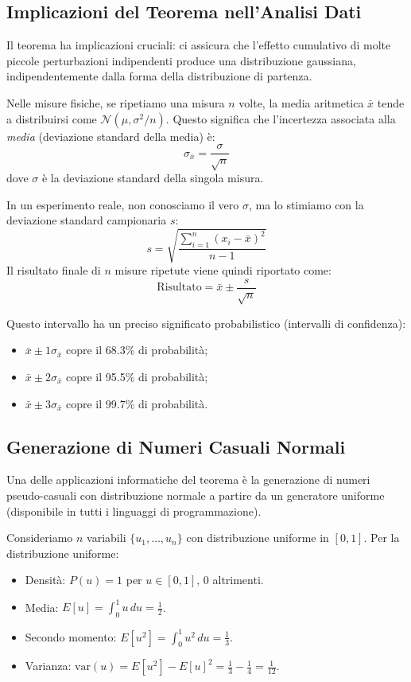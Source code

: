 \documentclass[openany,a4paper,12pt]{book}
\theoremstyle{remark}
\begin{document}
\subsection*{Implicazioni del Teorema nell'Analisi Dati}

Il teorema ha implicazioni cruciali: ci assicura che l'effetto cumulativo di molte piccole perturbazioni indipendenti produce una distribuzione gaussiana, indipendentemente dalla forma della distribuzione di partenza.

Nelle misure fisiche, se ripetiamo una misura $n$ volte, la media aritmetica $\bar{x}$ tende a distribuirsi come $\mathcal{N}(\mu, \sigma^2/n)$. Questo significa che l'incertezza associata alla \textit{media} (deviazione standard della media) è:
\begin{equation}
\sigma_{\bar{x}} = \frac{\sigma}{\sqrt{n}}
\end{equation}
dove $\sigma$ è la deviazione standard della singola misura.

In un esperimento reale, non conosciamo il vero $\sigma$, ma lo stimiamo con la deviazione standard campionaria $s$:
\[
s = \sqrt{\frac{\sum_{i=1}^{n} (x_i-\bar{x})^2}{n-1}}
\]
Il risultato finale di $n$ misure ripetute viene quindi riportato come:
\begin{equation}
\text{Risultato} = \bar{x} \pm \frac{s}{\sqrt{n}}
\end{equation}

Questo intervallo ha un preciso significato probabilistico (intervalli di confidenza):
\begin{itemize}
    \item $\bar{x} \pm 1\sigma_{\bar{x}}$ copre il 68.3\% di probabilità;
    \item $\bar{x} \pm 2\sigma_{\bar{x}}$ copre il 95.5\% di probabilità;
    \item $\bar{x} \pm 3\sigma_{\bar{x}}$ copre il 99.7\% di probabilità.
\end{itemize}

\subsection{Generazione di Numeri Casuali Normali}

Una delle applicazioni informatiche del teorema è la generazione di numeri pseudo-casuali con distribuzione normale a partire da un generatore uniforme (disponibile in tutti i linguaggi di programmazione).

Consideriamo $n$ variabili $\{u_1, \dots, u_n\}$ con distribuzione uniforme in $[0, 1]$.
Per la distribuzione uniforme:
\begin{itemize}
    \item Densità: $P(u) = 1$ per $u \in [0,1]$, $0$ altrimenti.
    \item Media: $E[u] = \int_0^1 u \, du = \frac{1}{2}$.
    \item Secondo momento: $E[u^2] = \int_0^1 u^2 \, du = \frac{1}{3}$.
    \item Varianza: $\text{var}(u) = E[u^2] - E[u]^2 = \frac{1}{3} - \frac{1}{4} = \frac{1}{12}$.
\end{itemize}
\end{document}
